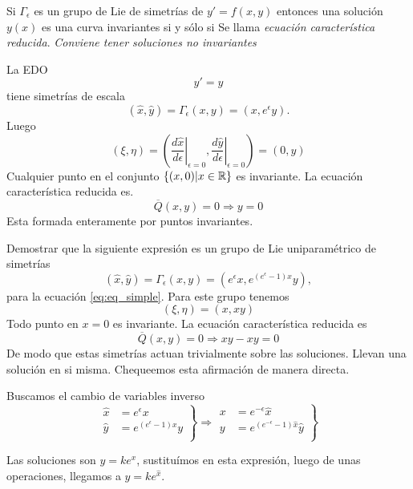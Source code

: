 Si $\Gamma_{\epsilon}$ es un grupo de Lie de simetrías de $y'=f(x,y)$ entonces una solución $y(x)$ es una curva invariantes si y sólo si
Se llama \emph{ecuación característica reducida}.
\emph{Conviene tener soluciones no invariantes}




\begin{ejemplo} La EDO
\begin{equation}\label{eq:eq_simple}y'=y
 \end{equation}
tiene simetrías de escala
\[(\hat{x},\hat{y})=\Gamma_{\epsilon}(x,y)=(x,e^{\epsilon}y).
 \]
Luego 
\[(\xi,\eta)=\left(\left.\frac{d\hat{x}}{d\epsilon}\right|_{\epsilon=0}, \left.\frac{d\hat{y}}{d\epsilon}\right|_{\epsilon=0}   \right)=(0,y)\]
Cualquier punto en el conjunto $\{(x,0)|x\in\mathbb{R}\}$  es invariante. La ecuación característica reducida es.
\[\overline{Q}(x,y)=0\Rightarrow y=0\]
Esta formada enteramente por puntos invariantes.
\end{ejemplo}



\begin{ejemplo} Demostrar que la siguiente expresión es un grupo de Lie uniparamétrico de simetrías
\[(\hat{x},\hat{y})=\Gamma_{\epsilon}(x,y)=(e^{\epsilon}x,e^{(e^{\epsilon}-1)x}y),\]
para la ecuación \eqref{eq:eq_simple}.
Para este grupo tenemos
\[(\xi,\eta)=(x,xy)\]
Todo punto en $x=0$ es invariante. La ecuación característica reducida es
\[\overline{Q}(x,y)=0\Rightarrow xy-xy=0\]
De modo que estas simetrías actuan trivialmente sobre las soluciones. Llevan una solución en si misma. Chequeemos esta afirmación de manera directa. 
\end{ejemplo}

Buscamos el cambio de variables inverso
\[
\left.
\begin{array}{ll} 
  \hat{x}&= e^{\epsilon}x\\
  \hat{y}&=e^{(e^{\epsilon}-1)x}y\\
\end{array}
\right\} 
\Rightarrow  
    \left.
\begin{array}{ll} 
  x&= e^{-\epsilon}\hat{x}\\
  y&=e^{(e^{-\epsilon}-1)\hat{x}}\hat{y}\\
\end{array}
\right\} 
\]    

Las soluciones son $y=ke^x$, sustituímos en esta expresión, luego de unas operaciones, llegamos a $\hat{y}=ke^{\hat{x}}$.

